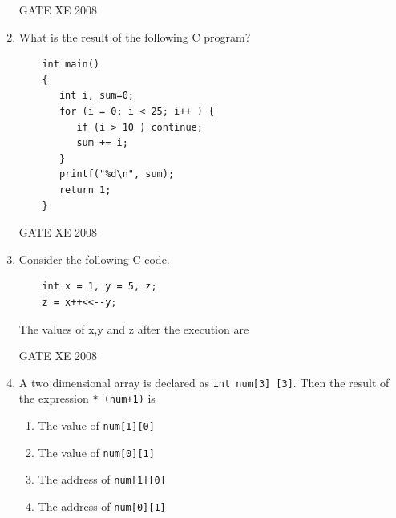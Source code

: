 \documentclass[12pt]{article}
\begin{document}
\begin{enumerate}
GATE XE 2008
\item  What is the result of the following C program?
\begin{verbatim}
    int main()
    {
       int i, sum=0;
       for (i = 0; i < 25; i++ ) {
          if (i > 10 ) continue;
          sum += i;
       }
       printf("%d\n", sum);
       return 1;
    }   
\end{verbatim}

\begin{enumerate}
\end{enumerate}

GATE XE 2008
\item  Consider the following C code.
\begin{verbatim}
    int x = 1, y = 5, z;
    z = x++<<--y;

\end{verbatim}
The values of x,y and z after the execution are

\begin{enumerate}
\end{enumerate}

GATE XE 2008
\item A two dimensional array is declared as \texttt{int num[3] [3]}. Then the result of the expression \texttt{* (num+1)} is

\begin{enumerate}
\item The value of \texttt{num[1][0]}

\item  The value of \texttt{num[0][1]}

\item  The address of \texttt{num[1][0]}

\item  The address of \texttt{num[0][1]}
\end{enumerate}


\end{enumerate}
\end{document}
